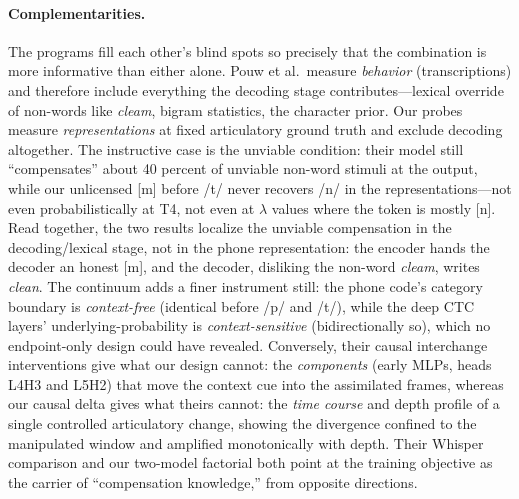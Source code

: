 \documentclass[11pt,a4paper]{article}
\newcommand{\lam}{\lambda}
\begin{document}
\paragraph{Complementarities.}
The programs fill each other's blind spots so precisely that the
combination is more informative than either alone. Pouw et al.\ measure
\emph{behavior} (transcriptions) and therefore include everything the
decoding stage contributes---lexical override of non-words like
\emph{cleam}, bigram statistics, the character prior. Our probes
measure \emph{representations} at fixed articulatory ground truth and
exclude decoding altogether. The instructive case is the unviable
condition: their model still ``compensates'' about 40 percent of
unviable non-word stimuli at the output, while our unlicensed [m]
before /t/ never recovers /n/ in the representations---not even
probabilistically at T4, not even at $\lam$ values where the token is
mostly [n]. Read together, the two results localize the unviable
compensation in the decoding/lexical stage, not in the phone
representation: the encoder hands the decoder an honest [m], and the
decoder, disliking the non-word \emph{cleam}, writes \emph{clean}. The
continuum adds a finer instrument still: the phone code's category
boundary is \emph{context-free} (identical before /p/ and /t/), while
the deep CTC layers' underlying-probability is \emph{context-sensitive}
(bidirectionally so), which no endpoint-only design could have
revealed. Conversely, their causal interchange interventions give what
our design cannot: the \emph{components} (early MLPs, heads L4H3 and
L5H2) that move the context cue into the assimilated frames, whereas
our causal delta gives what theirs cannot: the \emph{time course} and
depth profile of a single controlled articulatory change, showing the
divergence confined to the manipulated window and amplified
monotonically with depth. Their Whisper comparison and our two-model
factorial both point at the training objective as the carrier of
``compensation knowledge,'' from opposite directions.
\end{document}
